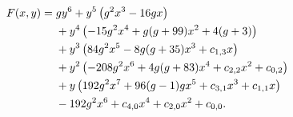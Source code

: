 \begin{align}
    \label{curve:quartic_mgg}
    F(x,y)={} & gy^{6}{}+y^{5}\left(g^2x^{3} - 16 gx\right)\notag \\
              & {}+y^{4}\left(-15 g^2x^{4} + g (g+99)x^{2} + 4 (g+3)\right)\notag \\
              & {}+y^{3}\left(84 g^2x^{5} - 8 g (g+35)x^{3} + c_{1,3}x\right)\notag \\
              & {}+y^{2}\left(-208 g^2x^{6} + 4 g (g+83)x^{4} + c_{2,2}x^{2} + c_{0,2}\right)\notag \\
              & {}+y\left(192 g^2x^{7} + 96 (g-1) gx^{5} + c_{3,1}x^{3} + c_{1,1}x\right)\notag \\
              & {}-192 g^2x^{6} + c_{4,0}x^{4} + c_{2,0}x^{2} + c_{0,0}.
\end{align}
